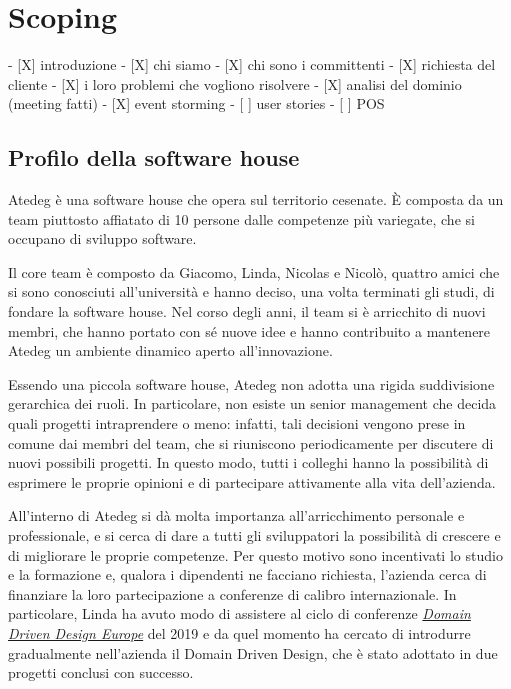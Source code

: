 \chapter{Scoping}\label{ch:scoping}

- [X] introduzione
- [X] chi siamo
- [X] chi sono i committenti
- [X] richiesta del cliente
  - [X] i loro problemi che vogliono risolvere
- [X] analisi del dominio (meeting fatti)
  - [X] event storming
- [ ] user stories  
- [ ] POS 


\section{Profilo della software house}\label{sec:profilo-della-software-house}
Atedeg è una software house che opera sul territorio cesenate. È composta da un team piuttosto affiatato di 10 persone dalle competenze più variegate, che si occupano di sviluppo software.

Il core team è composto da Giacomo, Linda, Nicolas e Nicolò, quattro amici che si sono conosciuti all'università e hanno deciso, una volta terminati gli studi, di fondare la software house.
Nel corso degli anni, il team si è arricchito di nuovi membri, che hanno portato con sé nuove idee e hanno contribuito a mantenere Atedeg un ambiente dinamico aperto all'innovazione. 

Essendo una piccola software house, Atedeg non adotta una rigida suddivisione gerarchica dei ruoli. In particolare, non esiste un senior management che decida quali progetti intraprendere o meno: infatti, tali decisioni vengono prese in comune dai membri del team, che si riuniscono periodicamente per discutere di nuovi possibili progetti. In questo modo, tutti i colleghi hanno la possibilità di esprimere le proprie opinioni e di partecipare attivamente alla vita dell'azienda.

All'interno di Atedeg si dà molta importanza all'arricchimento personale e professionale, e si cerca di dare a tutti gli sviluppatori la possibilità di crescere e di migliorare le proprie competenze. Per questo motivo sono incentivati lo studio e la formazione e, qualora i dipendenti ne facciano richiesta, l'azienda cerca di finanziare la loro partecipazione a conferenze di calibro internazionale.  In particolare, Linda ha avuto modo di assistere al ciclo di conferenze \href{https://dddeurope.com}{\emph{Domain Driven Design Europe}} del 2019 e da quel momento ha cercato di introdurre gradualmente nell'azienda il Domain Driven Design, che è stato adottato in due progetti conclusi con successo.

